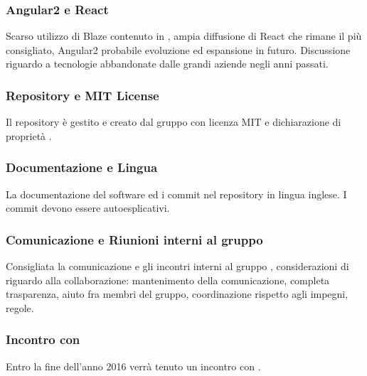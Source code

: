 \subsubsection{Angular2 e React}
Scarso utilizzo di Blaze contenuto in , ampia diffusione di React che rimane il più consigliato, Angular2 probabile evoluzione ed espansione in futuro.
Discussione riguardo a tecnologie abbandonate dalle grandi aziende negli anni passati.

\subsubsection{Repository e MIT License}
Il repository è gestito e creato dal gruppo \GroupName con licenza MIT e dichiarazione di proprietà \Proponente.

\subsubsection{Documentazione e Lingua}
La documentazione del software ed i commit nel repository in lingua inglese. I commit devono essere autoesplicativi.

\subsubsection{Comunicazione e Riunioni interni al gruppo \GroupName}
Consigliata la comunicazione e gli incontri interni al gruppo \GroupName, considerazioni di \Proponente riguardo alla collaborazione: mantenimento della comunicazione, completa trasparenza, aiuto fra membri del gruppo, coordinazione rispetto agli impegni, regole. 

\subsubsection{Incontro con \Proponente}
Entro la fine dell'anno 2016 verrà tenuto un incontro con \Proponente.

\clearpage
